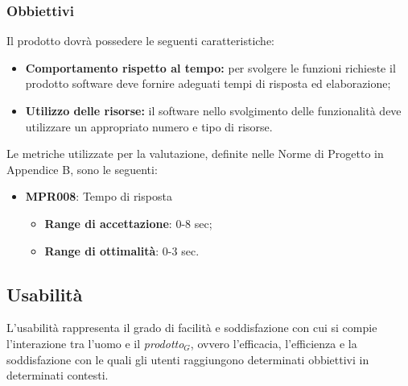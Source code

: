 \subsubsection{Obbiettivi } Il prodotto dovrà possedere le seguenti caratteristiche:
\begin{itemize}
	\item \textbf{Comportamento rispetto al tempo:} per svolgere le  funzioni richieste il prodotto software deve fornire adeguati tempi di risposta ed elaborazione;
	\item \textbf{Utilizzo delle risorse:} il software nello svolgimento delle funzionalità deve utilizzare un appropriato numero e tipo di risorse.
\end{itemize}
Le metriche utilizzate per la valutazione, definite nelle Norme di Progetto in Appendice B, sono le seguenti:
\begin{itemize}
	\item \textbf{MPR008}: Tempo di risposta
	\begin{itemize}
		\item \textbf{Range di accettazione}: 0-8 sec;
		\item \textbf{Range di ottimalità}: 0-3 sec.
	\end{itemize}
\end{itemize}

\subsection{Usabilità}
L'usabilità rappresenta il grado di facilità e soddisfazione con cui si compie l'interazione tra l'uomo e il \textit{prodotto$_{G}$}, ovvero l'efficacia, l'efficienza e la soddisfazione con le quali gli utenti raggiungono determinati obbiettivi in determinati contesti.
